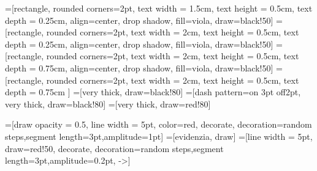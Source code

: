 =[rectangle, rounded corners=2pt, text width = 1.5cm, text height = 0.5cm, text depth = 0.25cm, align=center, drop shadow, fill=viola, draw=black!50]
=[rectangle, rounded corners=2pt, text width = 2cm, text height = 0.5cm, text depth = 0.25cm, align=center, drop shadow, fill=viola, draw=black!50]
=[rectangle, rounded corners=2pt, text width = 2cm, text height = 0.5cm, text depth = 0.75cm, align=center, drop shadow, fill=viola, draw=black!50]
=[rectangle, rounded corners=2pt, text width = 2cm, text height = 0.5cm, text depth = 0.75cm ]
=[very thick, draw=black!80]
=[dash pattern=on 3pt off2pt, very thick, draw=black!80]
=[very thick, draw=red!80]

=[draw opacity = 0.5, line width = 5pt, color=red, decorate, decoration={random steps,segment length=3pt,amplitude=1pt}]
=[evidenzia, draw]%
=[line width = 5pt, draw=red!50, decorate, decoration={random steps,segment length=3pt,amplitude=0.2pt}, ->]

\newcommand{\unicocodet}[1]{\texttt{\bfseries #1}}
\newcommand{\dimg}{\scriptsize}

\newcommand{\dimt}{\tiny}
\newcommand{\codt}[1]{\dimt #1}
